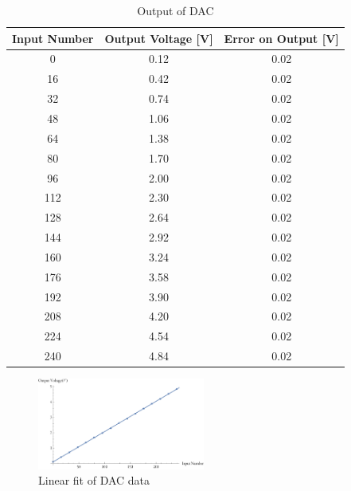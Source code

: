 \documentclass[aps,prl,reprint]{revtex4-1}
\begin{document}
        \begin{table}[h]
            \begin{ruledtabular}
                \begin{tabular}{ccc}
                    Input Number & Output Voltage [V] & Error on Output [V] \\ \hline
                    0 & 0.12 & 0.02 \\
                    16 & 0.42 & 0.02 \\
                    32 & 0.74 & 0.02 \\
                    48 & 1.06 & 0.02 \\
                    64 & 1.38 & 0.02 \\
                    80 & 1.70 & 0.02 \\
                    96 & 2.00 & 0.02 \\
                    112 & 2.30 & 0.02 \\
                    128 & 2.64 & 0.02 \\
                    144 & 2.92 & 0.02 \\
                    160 & 3.24 & 0.02 \\
                    176 & 3.58 & 0.02 \\
                    192 & 3.90 & 0.02 \\
                    208 & 4.20 & 0.02 \\
                    224 & 4.54 & 0.02 \\
                    240 & 4.84 & 0.02 \\
                \end{tabular}
            \end{ruledtabular}
            \caption{Output of DAC}
            \label{table:dac}
        \end{table} 
        \begin{figure}[h]
            \centering
            \includegraphics[width=0.49\textwidth]{image/plot.pdf}
            \caption{Linear fit of DAC data}
            \label{fig:dacPlot}
        \end{figure}
\end{document}
